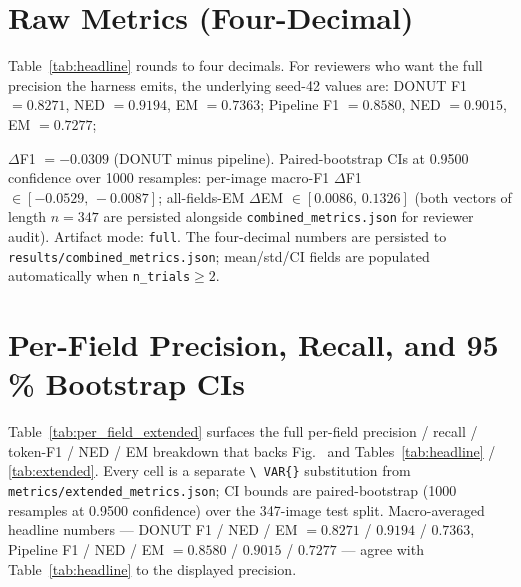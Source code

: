\documentclass[conference]{IEEEtran}
\makeatletter
\newcommand{\figref}[1]{%
  \@ifundefined{r@#1}{\textit{[figure absent]}}{\ref{#1}}%
}
\makeatother
\begin{document}
\section{Raw Metrics (Four-Decimal)}
\label{app:raw}

Table~\ref{tab:headline} rounds to four decimals.  For reviewers who
want the full precision the harness emits, the underlying seed-42
values are:
DONUT F1 $=0.8271$, NED $=0.9194$, EM $=0.7363$;
Pipeline F1 $=0.8580$, NED $=0.9015$, EM $=0.7277$;

$\Delta$F1 $=-0.0309$ (DONUT minus pipeline).
Paired-bootstrap CIs at 0.9500 confidence over
1000 resamples: per-image macro-F1
$\Delta$F1 $\in [-0.0529,\,-0.0087]$;
all-fields-EM $\Delta$EM
$\in [0.0086,\,0.1326]$
(both vectors of length $n=347$ are persisted alongside
\texttt{combined\_metrics.json} for reviewer audit).
Artifact mode: \texttt{full}.
The four-decimal numbers are persisted to
\texttt{results/combined\_metrics.json}; mean/std/CI fields are
populated automatically when \texttt{n\_trials}$\ge 2$.

\section{Per-Field Precision, Recall, and 95\,\% Bootstrap CIs}
\label{app:per_field_extended}

Table~\ref{tab:per_field_extended} surfaces the full per-field
precision / recall / token-F1 / NED / EM breakdown that backs
Fig.~\figref{fig:f1_grouped} and Tables~\ref{tab:headline} /
\ref{tab:extended}.  Every cell is a separate \texttt{\textbackslash
VAR\{\}} substitution from \texttt{metrics/extended\_metrics.json}; CI
bounds are paired-bootstrap (1000 resamples at
0.9500 confidence) over the 347-image test split.
Macro-averaged headline numbers ---
DONUT F1 / NED / EM $=0.8271$ / $0.9194$
/ $0.7363$, Pipeline F1 / NED / EM
$=0.8580$ / $0.9015$ /
$0.7277$ --- agree with Table~\ref{tab:headline} to
the displayed precision.
\end{document}
